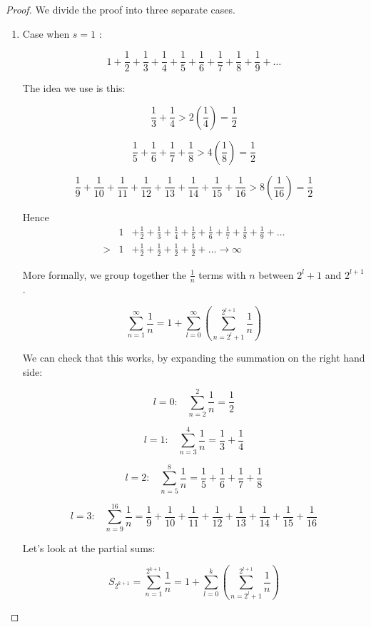 \documentclass[12pt]{scrbook}
\begin{document}
\begin{proof}

We divide the proof into three separate cases.
\begin{enumerate}
\item Case when $s = 1$ :

\[ 1 + \frac{1}{2} + \frac{1}{3} +\frac{1}{4} + \frac{1}{5} +
\frac{1}{6} + \frac{1}{7} + \frac{1}{8} + \frac{1}{9} + \ldots \]

The idea we use is this:

\[ \frac{1}{3} +  \frac{1}{4}  > 2\left( \frac{1}{4} \right)  = \frac{1}{2}  \]

\[ \frac{1}{5} + \frac{1}{6} + \frac{1}{7} + \frac{1}{8} > 4\left( \frac{1}{8} \right)  = \frac{1}{2}  \]

\[ \frac{1}{9} + \frac{1}{10} + \frac{1}{11}+ \frac{1}{12} +
\frac{1}{13} + \frac{1}{14} + \frac{1}{15} + \frac{1}{16 }> 8\left( \frac{1}{16} \right)  =
\frac{1}{2}  \]

Hence
\begin{eqnarray*}
&1& + \frac{1}{2} + \frac{1}{3} +\frac{1}{4} + \frac{1}{5} + \frac{1}{6} + \frac{1}{7} + \frac{1}{8} + \frac{1}{9} + \ldots \\
> &1& + \frac{1}{2} +  \frac{1}{2} + \frac{1}{2} + \frac{1}{2} + \ldots \rightarrow \infty 
\end{eqnarray*}

More formally, we group together the $\frac{1}{n}$ terms with $n$ between $2^{l} + 1$ and $2^{l+1}$.

\[ \sum_{n=1}^{\infty} \frac{1}{n} = 1 + \sum_{l=0}^{\infty} \left( \sum_{n=2^{l} + 1}^{2^{l+1}} \frac{1}{n} \right) \]

We can check that this works, by expanding the summation on the right hand side:

\[ l = 0: \;\;\;  \sum_{n=2}^{2} \frac{1}{n}  = \frac{1}{2} \]

\[ l = 1: \;\;\; \sum_{n=3}^{4} \frac{1}{n}  =\frac{1}{3} + \frac{1}{4} \]

\[ l = 2: \;\;\; \sum_{n=5}^{8} \frac{1}{n}  =\frac{1}{5} +\frac{1}{6} +  \frac{1}{7} + \frac{1}{8} \]

\[ l = 3: \;\;\; \sum_{n=9}^{16} \frac{1}{n}  =\frac{1}{9} +\frac{1}{10} +  \frac{1}{11} + \frac{1}{12} 
+ \frac{1}{13} + \frac{1}{14} + \frac{1}{15} + \frac{1}{16}  \]

Let's look at the partial sums:

\[ S_{2^{k+1}} = \sum_{n=1}^{2^{k+1}} \frac{1}{n}  = 1 + \sum_{l=0}^{k}\left( \sum_{n=2^l + 1}^{2^{l+1}} \frac{1}{n}  \right) \]


\end{enumerate}
\end{proof}
\end{document}
